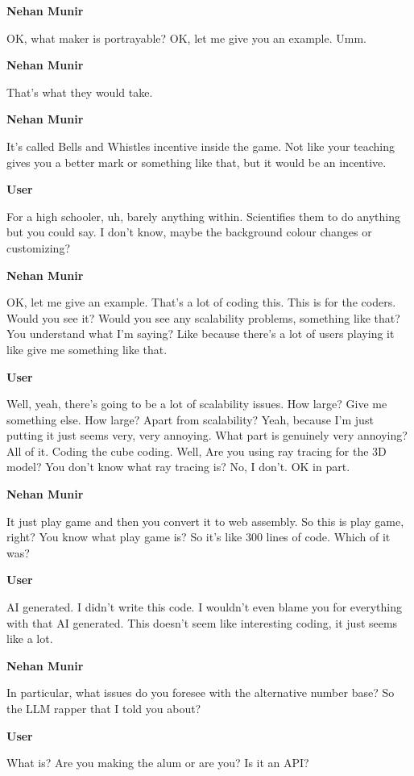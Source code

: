 \documentclass{article}
\begin{document}
\noindent \textbf{Nehan Munir}

OK, what maker is portrayable? OK, let me give you an example. Umm.

\noindent \textbf{Nehan Munir}

That's what they would take.

\noindent \textbf{Nehan  Munir}

It's called Bells and Whistles incentive inside the game. Not like your teaching gives you a better mark or something like that, but it would be an incentive.

\noindent \textbf{User}

For a high schooler, uh, barely anything within. Scientifies them to do anything but you could say. I don't know, maybe the background colour changes or customizing?

\noindent \textbf{Nehan Munir}

OK, let me give an example. That's a lot of coding this. This is for the coders. Would you see it? Would you see any scalability problems, something like that? You understand what I'm saying? Like because there's a lot of users playing it like give me something like that.

\noindent \textbf{User}

Well, yeah, there's going to be a lot of scalability issues. How large? Give me something else. How large? Apart from scalability? Yeah, because I'm just putting it just seems very, very annoying. What part is genuinely very annoying? All of it. Coding the cube coding. Well, Are you using ray tracing for the 3D model? You don't know what ray tracing is? No, I don't. OK in part.

\noindent \textbf{Nehan Munir}

It just play game and then you convert it to web assembly. So this is play game, right? You know what play game is? So it's like 300 lines of code. Which of it was?

\noindent \textbf{User}

AI generated. I didn't write this code. I wouldn't even blame you for everything with that AI generated. This doesn't seem like interesting coding, it just seems like a lot.

\noindent \textbf{Nehan Munir}

In particular, what issues do you foresee with the alternative number base? So the LLM rapper that I told you about?

\noindent \textbf{User}

What is? Are you making the alum or are you? Is it an API?
\end{document}
